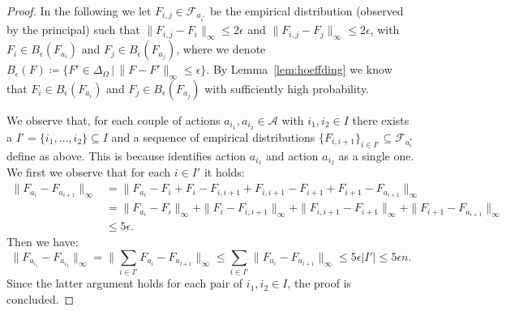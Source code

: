 \begin{proof} 

In the following we let $F_{i,j} \in \mathcal{F}_{a_{i^*}}$ be the empirical distribution (observed by the principal) such that $\|F_{i,j} - F_{i}\|_{\infty} \le 2\epsilon$ and $\|F_{i,j} - F_{j}\|_{\infty} \le 2\epsilon$, with $F_i \in B_\epsilon(F_{a_i})$ and $F_{j} \in B_\epsilon(F_{a_{j}})$, where we denote $B_\epsilon(F) \coloneqq \{F' \in \Delta_\Omega \, | \, \| F - F' \|_{\infty} \le \epsilon   \}$. By Lemma~\ref{lem:hoeffding} we know that $F_i \in B_\epsilon(F_{a_i})$ and $F_{j} \in B_\epsilon(F_{a_{j}})$ with sufficiently high probability.


We observe that, for each couple of actions $a_{i_1}, a_{i_2} \in \mathcal{A}$ with $i_1,i_2 \in I$ there exists a $I'=\{i_1, \dots, i_2\} \subseteq I$ and a sequence of empirical distributions $\{ F_{i,i+1}\}_{i \in I'} \subseteq \mathcal{F}_{a_i^*}$ define as above. This is because \ActionOracle identifies action $a_{i_1}$ and action $ a_{i_2}$ as a single one. We first we observe that for each $i \in I'$ it holds:
\begin{align*}
\| F_{a_{i}} - F_{a_{i+1}}\|_{\infty} & =   \| F_{a_{i}} - F_{i} + F_{i} - F_{i,i+1} + F_{i,i+1}  - F_{i+1} + F_{i+1} - F_{a_{i+1}}\|_{\infty} \\
& =   \| F_{a_{i}} - F_{i}  \|_{\infty} + \| F_{i} - F_{i,i+1}  \|_{\infty} +  \| F_{i,i+1} - F_{i+1}\|_{\infty} + \| F_{i+1} - F_{a_{i+1}} \|_{\infty} \\
& \le 5 \epsilon.
\end{align*}
Then we have:
\begin{equation*}
 \| F_{a_{i_1}} - F_{a_{i_2}} \|_{\infty} = \| \sum_{i \in I'} F_{a_{i}} - F_{a_{i+1}} \|_{\infty} \le \sum_{i \in I'} \| F_{a_{i}} - F_{a_{i+1}}\|_{\infty} \le 5 \epsilon |I'| \le 5 \epsilon n.
\end{equation*}
Since the latter argument holds for each pair of $i_1,i_2 \in I$, the proof is concluded.
\end{proof}

